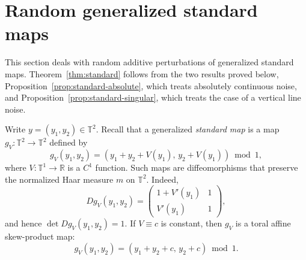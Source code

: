 \documentclass[a4paper,12pt,reqno]{amsart}
\numberwithin{equation}{section}
\newcommand{\Rr}{{\mathbb{R}}}
\newcommand{\Tt}{{\mathbb{T}}}
\begin{document}






\section{Random generalized standard maps}
\label{sec:random_standard}

This section deals with random additive perturbations of generalized standard maps. Theorem~\ref{thm:standard} follows from the two results proved below, Proposition~\ref{prop:standard-absolute}, which treats absolutely continuous noise, and Proposition~\ref{prop:standard-singular}, which treats the case of a vertical line noise. 

Write $y=(y_1,y_2) \in \Tt^2$. Recall that a generalized \emph{standard map} is a map $g_V:\Tt^2\to\Tt^2$ defined by
\[
g_V(y_1,y_2)
=
\left(y_1+y_2+V(y_1),\, y_2+V(y_1)\right) \bmod 1,
\]
where $V:\Tt^1\to\Rr$ is a $C^1$ function. Such maps are diffeomorphisms that preserve the normalized Haar measure $m$ on $\Tt^2$. Indeed, 
\[
Dg_V(y_1,y_2)
=
\begin{pmatrix}
1+V'(y_1) & 1\\
V'(y_1) & 1
\end{pmatrix},
\]
and hence $\det Dg_V(y_1,y_2)=1$. If $V\equiv c$ is constant, then $g_V$ is a toral affine skew-product map:
\[
g_V(y_1,y_2)
=
(y_1+y_2+c,\, y_2+c) \bmod 1.
\]
\end{document}
